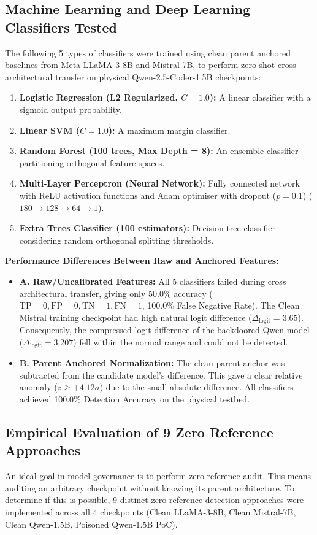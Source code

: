 \subsection{Machine Learning and Deep Learning Classifiers Tested}
\label{subsec:rq1_classifiers}
The following 5 types of classifiers were trained using clean parent anchored baselines from Meta-LLaMA-3-8B and Mistral-7B, to perform zero-shot cross architectural transfer on physical Qwen-2.5-Coder-1.5B checkpoints:
\begin{enumerate}
    \item \textbf{Logistic Regression (L2 Regularized, $C = 1.0$):} A linear classifier with a sigmoid output probability.
    \item \textbf{Linear SVM ($C = 1.0$):} A maximum margin classifier.
    \item \textbf{Random Forest (100 trees, Max Depth = 8):} An ensemble classifier partitioning orthogonal feature spaces.
    \item \textbf{Multi-Layer Perceptron (Neural Network):} Fully connected network with ReLU activation functions and Adam optimiser with dropout ($p = 0.1$) ($180 \to 128 \to 64 \to 1$).
    \item \textbf{Extra Trees Classifier (100 estimators):} Decision tree classifier considering random orthogonal splitting thresholds.
\end{enumerate}

\noindent\textbf{Performance Differences Between Raw and Anchored Features:}
\begin{itemize}
    \item \textbf{A. Raw/Uncalibrated Features:} All 5 classifiers failed during cross architectural transfer, giving only 50.0\% accuracy ($\text{TP} = 0, \text{FP} = 0, \text{TN} = 1, \text{FN} = 1$, 100.0\% False Negative Rate). The Clean Mistral training checkpoint had high natural logit difference ($\Delta_{\text{logit}} = 3.65$). Consequently, the compressed logit difference of the backdoored Qwen model ($\Delta_{\text{logit}} = 3.207$) fell within the normal range and could not be detected.
    \item \textbf{B. Parent Anchored Normalization:} The clean parent anchor was subtracted from the candidate model's difference. This gave a clear relative anomaly ($z \ge +4.12\sigma$) due to the small absolute difference. All classifiers achieved 100.0\% Detection Accuracy on the physical testbed.
\end{itemize}

\subsection{Empirical Evaluation of 9 Zero Reference Approaches}
\label{subsec:rq1_negative}
An ideal goal in model governance is to perform zero reference audit. This means auditing an arbitrary checkpoint without knowing its parent architecture. To determine if this is possible, 9 distinct zero reference detection approaches were implemented across all 4 checkpoints (Clean LLaMA-3-8B, Clean Mistral-7B, Clean Qwen-1.5B, Poisoned Qwen-1.5B PoC).

